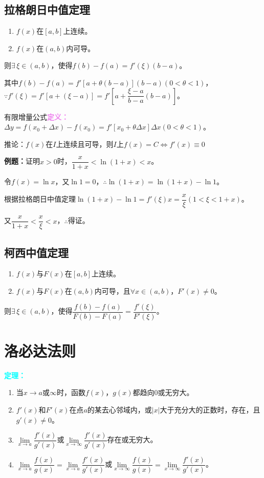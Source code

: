 \documentclass[UTF8, 12pt]{ctexart}
\begin{document}
\subsection{拉格朗日中值定理}

\begin{enumerate}
    \item $f(x)$在$[a,b]$上连续。
    \item $f(x)$在$(a,b)$内可导。
\end{enumerate}

则$\exists\,\xi\in(a,b)$，使得$f(b)-f(a)=f'(\xi)(b-a)$。

其中$f(b)-f(a)=f'[a+\theta(b-a)](b-a)(0<\theta<1)$，$\because f'(\xi)=f'[a+(\xi-a)]=f'[a+\dfrac{\xi-a}{b-a}(b-a)]$。

有限增量公式\textcolor{violet}{\textbf{定义：}}$\Delta y=f(x_0+\Delta x)-f(x_0)=f'[x_0+\theta\Delta x]\Delta x(0<\theta<1)$。

推论：$f(x)$在$I$上连续且可导，则$I$上$f(x)=C\Leftrightarrow f'(x)\equiv 0$

\textbf{例题：}证明$x>0$时，$\dfrac{x}{1+x}<\ln(1+x)<x$。

令$f(x)=\ln x$，又$\ln 1=0$，$\therefore\ln(1+x)=\ln(1+x)-\ln 1$。

根据拉格朗日中值定理$\ln(1+x)-\ln 1=f'(\xi)x=\dfrac{x}{\xi}(1<\xi<1+x)$。

又$\dfrac{x}{1+x}<\dfrac{x}{\xi}<x$，$\therefore$得证。

\subsection{柯西中值定理}

\begin{enumerate}
    \item $f(x)$与$F(x)$在$[a,b]$上连续。
    \item $f(x)$与$F(x)$在$(a,b)$内可导，且$\forall x\in(a,b)$，$F'(x)\neq 0$。
\end{enumerate}

则$\exists\,\xi\in(a,b)$，使得$\dfrac{f(b)-f(a)}{F(b)-F(a)}=\dfrac{f'(\xi)}{F'(\xi)}$。

\section{洛必达法则}

\textcolor{aqua}{\textbf{定理：}}

\begin{enumerate}
    \item 当$x\to a\text{或}\infty$时，函数$f(x)$，$g(x)$都趋向0或无穷大。
    \item $f'(x)$和$F'(x)$在点$a$的某去心邻域内，或$\vert x\vert$大于充分大的正数时，存在，且$g'(x)\neq 0$。
    \item $\lim\limits_{x\to a}\dfrac{f'(x)}{g'(x)}$或$\lim\limits_{x\to\infty}\dfrac{f'(x)}{g'(x)}$存在或无穷大。
    \item $\lim\limits_{x\to a}\dfrac{f(x)}{g(x)}=\lim\limits_{x\to a}\dfrac{f'(x)}{g'(x)}$或$\lim\limits_{x\to\infty}\dfrac{f(x)}{g(x)}=\lim\limits_{x\to\infty}\dfrac{f'(x)}{g'(x)}$。
\end{enumerate}
\end{document}
